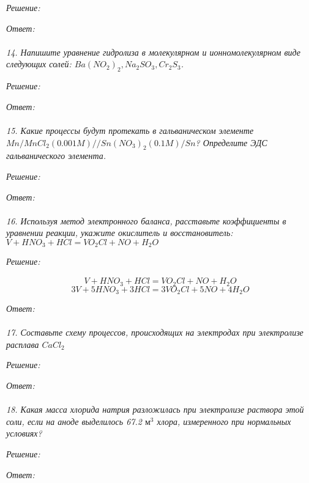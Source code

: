 \emph{Решение:}

\emph{Ответ: } \\\\


\emph{14. Напишите уравнение гидролиза в молекулярном и 
ионномолекулярном виде следующих солей: 
\( Ba(NO_2)_2, Na_2 SO_3, Cr_2 S_3 \).}

\emph{Решение:}

\emph{Ответ: } \\\\


\emph{15. Какие процессы будут протекать в гальваническом элементе 
\( Mn/MnCl_2(0.001 M)//Sn(NO_3)_2(0.1 M)/Sn \)? 
Определите ЭДС гальванического элемента.}

\emph{Решение:}

\emph{Ответ: } \\\\


\emph{16. Используя метод электронного баланса, расставьте коэффициенты 
в уравнении реакции, укажите окислитель и восстановитель:
\( V + HNO_3 + HCl = VO_2 Cl + NO + H_2 O \) }

\emph{Решение:}

\[ 
	\stackrel{}{V} + \stackrel{}{H}\stackrel{}{N}\stackrel{}{O}_3 + 
	\stackrel{}{H}\stackrel{}{Cl} = \stackrel{}{V}\stackrel{}{O}_2
	\stackrel{}{Cl} + 
	\stackrel{}{N}\stackrel{}{O} + \stackrel{}{H}_2\stackrel{}{O} 
\]
\[ 3V + 5HNO_3 + 3HCl = 3VO_2 Cl + 5NO + 4H_2 O \]

\emph{Ответ: } \\\\


\emph{17. Составьте схему процессов, происходящих на электродах при 
электролизе расплава \( CaCl_2 \)}

\emph{Решение:}

\emph{Ответ: } \\\\


\emph{18. Какая масса хлорида натрия разложилась при электролизе раствора 
этой соли, если на аноде выделилось 67.2 \( \text{м}^3 \) хлора, 
измеренного при нормальных условиях?}

\emph{Решение:}

\emph{Ответ: } \\\\


